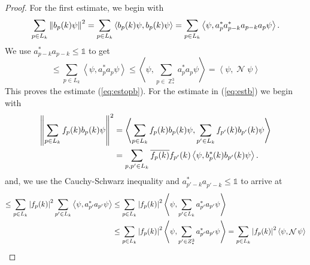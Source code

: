 \documentclass[sn-mathphys, Numbered ,a4paper]{sn-jnl}%
\DeclareMathOperator{\Z}{\mathbb{Z}}
\DeclareMathOperator{\NN}{\mathcal{N}}
\newcommand{\eva}[1]{\left\langle #1 \right\rangle}
\theoremstyle{plain}
\theoremstyle{definition}
\theoremstyle{remark}
\theoremstyle{plain}
\theoremstyle{definition}
\theoremstyle{remark}
\begin{document}
\begin{proof}
    For the first estimate, we begin with
    \begin{equation}
         \sum\limits_{p \in L_k}\norm{b_p(k)\psi}^2 = \sum\limits_{p \in L_k} \eva{b_p(k)\psi,b_p(k)\psi}= \sum\limits_{p \in L_k} \eva{\psi,a^*_{p} a^*_{p-k}a_{p-k} a_{p}\psi}.  
    \end{equation}
    We use $a^*_{p-k}a_{p-k} \leq \mathds{1}$ to get 
    \begin{equation}
        \leq \sum\limits_{p \in L_k} \eva{\psi,a^*_{p} a_{p}\psi}
        \leq \eva{\psi,\sum\limits_{p \in \Z^3_*}a^*_{p} a_{p}\psi} = \eva{\psi, \NN\psi}
    \end{equation}
    This proves the estimate (\ref{eq:estopb}). For the estimate in (\ref{eq:estb}) we begin with
    \begin{align}
        \norm{\sum\limits_{p\in L_k}f_p(k)b_p(k)\psi}^2 &= \eva{\sum\limits_{p\in L_k}f_p(k)b_p(k)\psi,\sum\limits_{p'\in L_k}f_{p'}(k)b_{p'}(k)\psi}\nonumber\\
        &= \sum\limits_{p,p' \in L_k} \overline{f_p(k)}f_{p'}(k) \eva{\psi,b^*_p(k)b_{p'}(k)\psi} \nonumber.  
    \end{align}
    and, we use the Cauchy-Schwarz inequality and $a^*_{p'-k}a^{\phantom{*}}_{p'-k} \leq \mathds{1}$ to arrive at 
    \begin{align}
        \leq \sum\limits_{p \in L_k} \abs{f_p(k)}^2 \sum\limits_{p' \in L_k} \eva{\psi,a^*_{p'} a_{p'} \psi} &\leq \sum\limits_{p \in L_k} \abs{f_p(k)}^2 \eva{\psi, \sum\limits_{p' \in L_k} a^*_{p'} a_{p'} \psi}\nonumber\\
        &\leq \sum\limits_{p \in L_k} \abs{f_p(k)}^2 \eva{\psi, \sum\limits_{p' \in Z^3_*} a^*_{p'} a_{p'} \psi}= \sum\limits_{p \in L_k} \abs{f_p(k)}^2 \eva{\psi, \NN \psi}
    \end{align}
    

\end{proof}
\end{document}
